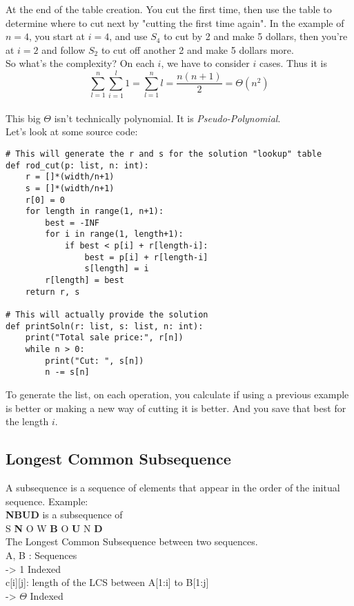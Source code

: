 \documentclass{article}
\begin{document}
At the end of the table creation. You cut the first time, then use the table to determine where to cut next by "cutting the first time again". In the example of \(n=4\), you start at \(i=4\), and use \(S_4\) to cut by 2 and make 5 dollars, then you're at \(i=2\) and follow \(S_2\) to cut off another 2 and make 5 dollars more. \\
So what's the complexity? On each \(i\), we have to consider \(i\) cases. Thus it is $$\sum_{l=1}^n\sum_{i=1}^l1 = \sum_{l=1}^nl = \frac{n(n+1)}{2} = \Theta(n^2)$$ \\
This big \(\Theta\) isn't technically polynomial. It is \emph{Pseudo-Polynomial}. \\
Let's look at some source code:

\begin{verbatim}
# This will generate the r and s for the solution "lookup" table
def rod_cut(p: list, n: int):
    r = []*(width/n+1)
    s = []*(width/n+1)
    r[0] = 0
    for length in range(1, n+1):
        best = -INF
        for i in range(1, length+1):
            if best < p[i] + r[length-i]:
                best = p[i] + r[length-i]
                s[length] = i
        r[length] = best
    return r, s

# This will actually provide the solution
def printSoln(r: list, s: list, n: int):
    print("Total sale price:", r[n])
    while n > 0:
        print("Cut: ", s[n])
        n -= s[n]
\end{verbatim}

To generate the list, on each operation, you calculate if using a previous example is better or making a new way of cutting it is better. And you save that best for the length \(i\).

\subsection{Longest Common Subsequence}
\label{sec:org35f9f06}
A subsequence is a sequence of elements that appear in the order of the initual sequence. Example: \\
\textbf{NBUD} is a subsequence of \\
S \textbf{N} O W \textbf{B} O \textbf{U} N \textbf{D} \\
The Longest Common Subsequence between two sequences. \\

A, B : Sequences \\
-> 1 Indexed \\
c[i][j]: length of the LCS between A[1:i] to B[1:j] \\
-> \(\Theta\) Indexed \\
\end{document}
